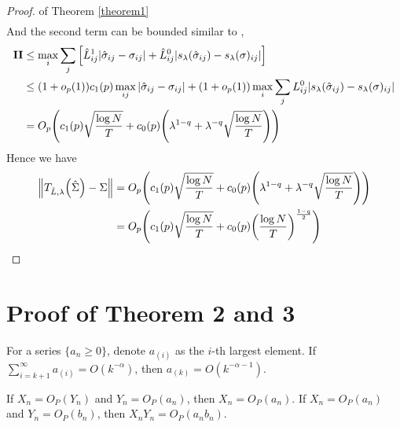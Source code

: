 \begin{proof}{ of Theorem \ref{theorem1}}
\begin{align*}
    \end{align*}
    And the second term can be bounded similar to \cite{rothman2009generalized}, 
    \begin{align*}
        \mathbf{II} &\leq  \max_{i} \sum_{j} \bqty{\hat{L}_{ij}^{1} \abs{\hat{\sigma}_{ij} - \sigma_{ij}} + \hat{L}_{ij}^{0} \abs{s_{\lambda}(\hat{\sigma}_{ij}) - s_{\lambda} (\sigma)_{ij}}}\\
        &\leq (1 + o_{p}(1))c_{1}(p)\max_{ij} \abs{\hat{\sigma}_{ij} - \sigma_{ij}} + (1 + o_{p}(1)) \max_{i} \sum_{j} L_{ij}^{0} \abs{s_{\lambda}(\hat{\sigma}_{ij}) - s_{\lambda} (\sigma)_{ij}} \\
        &= O_{p}\pqty{c_{1}(p) \sqrt{\frac{\log N}{T}} + c_{0}(p) \pqty{\lambda^{1-q} + \lambda^{-q} \sqrt{\frac{\log N}{T}}}} \\
    \end{align*}
    Hence we have 
    \begin{align*}
        \norm{T_{\hat{L},\lambda}\pqty{\hat{\Sigma}} - \Sigma } &= O_{p}\pqty{c_{1}(p) \sqrt{\frac{\log N}{T}} + c_{0}(p) \pqty{\lambda^{1-q} + \lambda^{-q} \sqrt{\frac{\log N}{T}}}} \\
        &= O_{p}\pqty{c_{1}(p) \sqrt{\frac{\log N}{T}} + c_{0}(p)\pqty{\frac{\log N}{T}}^{\frac{1-q}{2}}}
    \end{align*}
\end{proof}


\section{Proof of Theorem 2 and 3}
\begin{lemma}
    For a series $\{ a_n \geq 0 \}$, denote $a_{(i)}$ as the $i$-th largest element. If $\sum_{i=k+1}^\infty a_{(i)} = O(k^{-\alpha})$, then $a_{(k)} = O(k^{-\alpha-1})$.
    \label{lemma_sum_single}
\end{lemma}

\begin{lemma}
    If $X_n = O_P(Y_n)$ and $Y_n = O_P(a_n)$, then $X_n = O_P(a_n)$. If $X_n = O_P(a_n)$ and $Y_n = O_P(b_n)$, then $X_n Y_n = O_P(a_n b_n)$.
    \label{lemma_OP}
\end{lemma}

